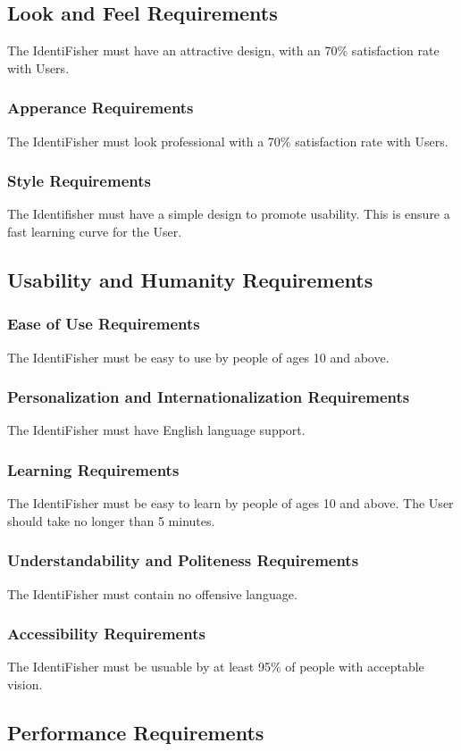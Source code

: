 \documentclass{article}
\begin{document}
\subsection{Look and Feel Requirements}
The IdentiFisher must have an attractive design, with an 70\% satisfaction rate with Users.
\subsubsection{Apperance Requirements}
The IdentiFisher must look professional with a 70\% satisfaction rate with Users.
\subsubsection{Style Requirements}
The Identifisher must have a simple design to promote usability. This is ensure a fast learning curve for the User.

\subsection{Usability and Humanity Requirements}
\subsubsection{Ease of Use Requirements}
The IdentiFisher must be easy to use by people of ages 10 and above.
\subsubsection{Personalization and Internationalization Requirements}
The IdentiFisher must have English language support.
\subsubsection{Learning Requirements}
The IdentiFisher must be easy to learn by people of ages 10 and above. The User should take no longer than
5 minutes.
\subsubsection{Understandability and Politeness Requirements}
The IdentiFisher must contain no offensive language.
\subsubsection{Accessibility Requirements}
The IdentiFisher must be usuable by at least 95\% of people with acceptable vision.
\subsection{Performance Requirements}
\end{document}
